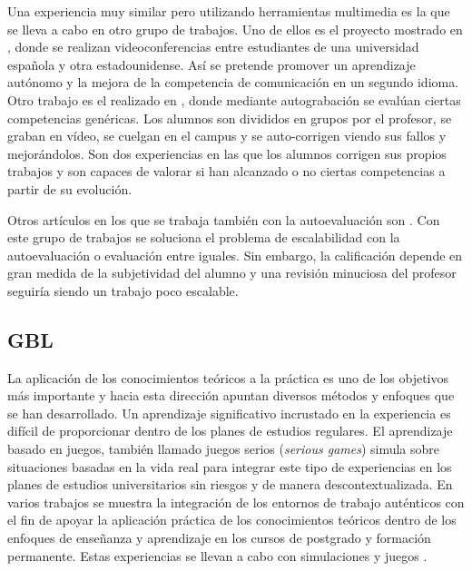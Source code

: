 Una experiencia muy similar pero utilizando herramientas multimedia es la que se lleva a cabo en otro grupo de trabajos. Uno de ellos es el proyecto mostrado en \cite{Martin-Cuadrado:2013}, donde se realizan videoconferencias entre estudiantes de una universidad española y otra estadounidense. Así se pretende promover un aprendizaje autónomo y la mejora de la competencia de comunicación en un segundo idioma. Otro trabajo es el realizado en \cite{Masip-Alvarez:2013}, donde mediante autograbación se evalúan ciertas competencias genéricas. Los alumnos son divididos en grupos por el profesor, se graban en vídeo, se cuelgan en el campus y se auto-corrigen viendo sus fallos y mejorándolos. Son dos experiencias en las que los alumnos corrigen sus propios trabajos y son capaces de valorar si han alcanzado o no ciertas competencias a partir de su evolución.

Otros artículos en los que se trabaja también con la autoevaluación son \cite{Colomo-Palacios:2013,Liao:2013,McMahon:2007,Murdoch-Eaton:2012,Chebil:2012,Cardona:2013}. Con este grupo de trabajos se soluciona el problema de escalabilidad con la autoevaluación o evaluación entre iguales. Sin embargo, la calificación depende en gran medida de la subjetividad del alumno y una revisión minuciosa del profesor seguiría siendo un trabajo poco escalable. 

\subsection{GBL} 
La aplicación de los conocimientos teóricos a la práctica es uno de los objetivos más importante y hacia esta dirección apuntan diversos métodos y enfoques que se han desarrollado. Un aprendizaje significativo incrustado en la experiencia es difícil de proporcionar dentro de los planes de estudios regulares. El aprendizaje basado en juegos, también llamado juegos serios (\emph{serious games}) simula sobre situaciones basadas en la vida real para integrar este tipo de experiencias en los planes de estudios universitarios sin riesgos y de manera descontextualizada. En varios trabajos se muestra la integración de los entornos de trabajo auténticos con el fin de apoyar la aplicación práctica de los conocimientos teóricos dentro de los enfoques de enseñanza y aprendizaje en los cursos de postgrado y formación permanente. Estas experiencias se llevan a cabo con simulaciones y juegos \cite{Petersen:2012,Borrajo:2010}.

